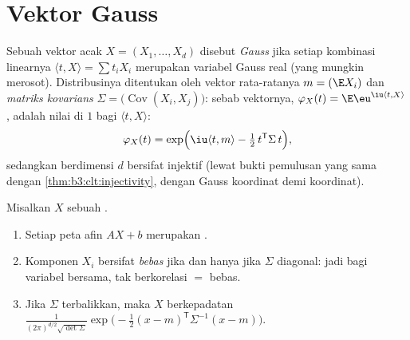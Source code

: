 \section{Vektor Gauss}

\begin{definition}\label{def:b3:clt:gaussianvector}
Sebuah vektor acak $X = (X_1, \dots, X_d)$ disebut
\emph{Gauss} jika setiap kombinasi
linearnya $\langle t, X\rangle = \sum t_iX_i$ merupakan
variabel Gauss real (yang mungkin merosot). Distribusinya
ditentukan oleh vektor rata-ratanya $m = (\E X_i)$ dan
\emph{matriks kovarians} $\Sigma = \bigl(\operatorname{Cov}
(X_i, X_j)\bigr)$: sebab 
vektornya, $\varphi_X(t) = \E\eu^{\iu\langle t, X\rangle}$, adalah
nilai di $1$ bagi  $\langle t, X\rangle$:
\[
\varphi_X(t) = \exp\Bigl(\iu\langle t, m\rangle -
\tfrac12\,t^{\mathsf T}\Sigma\,t\Bigr),
\]
sedangkan  berdimensi $d$ bersifat injektif
(lewat bukti pemulusan yang sama dengan \cref{thm:b3:clt:injectivity},
dengan Gauss koordinat demi koordinat).
\end{definition}

\begin{theorem}\label{thm:b3:clt:gaussianvector}
Misalkan $X$ sebuah .
\begin{enumerate}
  \item Setiap peta afin $AX + b$ merupakan .
  \item Komponen $X_i$ bersifat \emph{bebas} jika dan
        hanya jika $\Sigma$ diagonal: jadi bagi variabel 
        bersama, tak berkorelasi $=$ bebas.
  \item Jika $\Sigma$ terbalikkan, maka $X$ berkepadatan
        $\frac{1}{(2\pi)^{d/2}\sqrt{\det\Sigma}}
        \exp\bigl(-\frac12(x - m)^{\mathsf T}\Sigma^{-1}(x -
        m)\bigr)$.
\end{enumerate}
\end{theorem}

